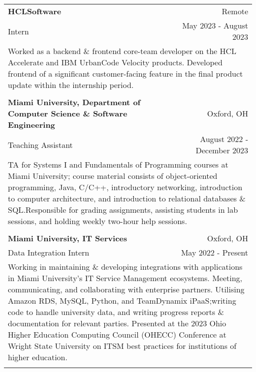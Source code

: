 \documentclass[letterpaper,8pt]{article} %
\begin{document}
\footnotesize{
\begin{tabular*}{\linewidth}{@{\extracolsep{\fill}} lr }

\textbf{HCLSoftware} & \footnotesize{Remote}\\
\footnotesize{Intern} & \footnotesize{May 2023 - August 2023}\\
\multicolumn{2}{p{\linewidth}}{\footnotesize{Worked as a backend \& frontend core-team developer on the HCL Accelerate and IBM UrbanCode Velocity products. Developed frontend of a significant customer-facing feature in the final product update within the internship period.}}\\
\multicolumn{2}{c}{} \\

    
\textbf{Miami University, Department of Computer Science \& Software Engineering} & \footnotesize{Oxford, OH}\\
\footnotesize{Teaching Assistant} & \footnotesize{August 2022 - December 2023}\\
\multicolumn{2}{p{\linewidth}}{\footnotesize{TA for Systems I and Fundamentals of Programming courses at Miami University; course material consists of object-oriented programming, Java, C/C++, introductory networking, introduction to computer architecture, and introduction to relational databases \& SQL.\@ Responsible for grading assignments, assisting students in lab sessions, and holding weekly two-hour help sessions.}}\\
\multicolumn{2}{c}{} \\


\textbf{Miami University, IT Services} & \footnotesize{Oxford, OH}\\
\footnotesize{Data Integration Intern} & \footnotesize{May 2022 - Present}\\
\multicolumn{2}{p{\linewidth}}{\footnotesize{Working in maintaining \& developing integrations with applications in Miami University's IT Service Management ecosystems. Meeting, communicating, and collaborating with enterprise partners. Utilising Amazon RDS, MySQL, Python, and TeamDynamix iPaaS;\@ writing code to handle university data, and writing progress reports \& documentation for relevant parties. Presented at the 2023 Ohio Higher Education Computing Council (OHECC) Conference at Wright State University on ITSM best practices for institutions of higher education.}}\\
\multicolumn{2}{c}{} \\


\end{tabular*}}
\end{document}
